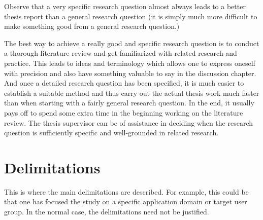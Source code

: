 \documentclass[english]{hitthesis}
\begin{document}
    Observe that a very specific research question almost always
    leads to a better thesis report than a general research question
    (it is simply much more difficult to make something good
    from a general research question.)

    The best way to achieve a really good and specific research
    question is to conduct a thorough literature review and get
    familiarized with related research and practice. This leads to
    ideas and terminology which allows one to express oneself
    with precision and also have something valuable to say in the
    discussion chapter. And once a detailed research question
    has been specified, it is much easier to establish a suitable
    method and thus carry out the actual thesis work much faster
    than when starting with a fairly general research question. In
    the end, it usually pays off to spend some extra time in the
    beginning working on the literature review. The thesis
    supervisor can be of assistance in deciding when the research
    question is sufficiently specific and well-grounded in related
    research.

    \section{Delimitations}
    \label{sec:delimitations}

    This is where the main delimitations are described. For
    example, this could be that one has focused the study on a
    specific application domain or target user group. In the
    normal case, the delimitations need not be justified.
\end{document}

